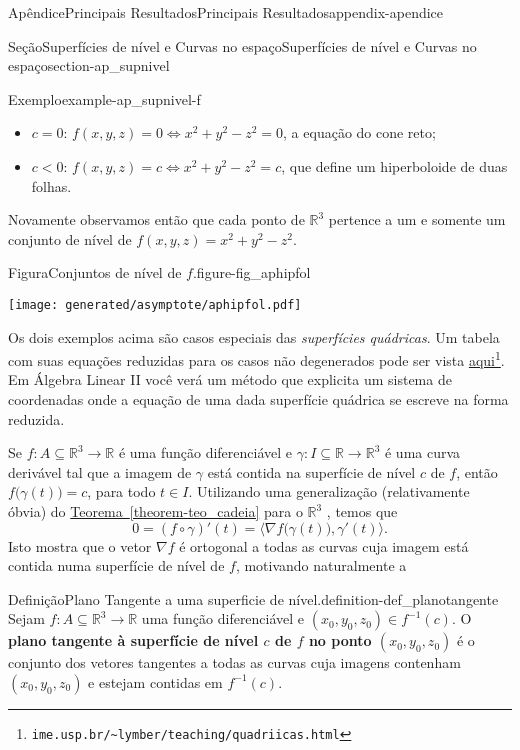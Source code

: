 \documentclass[oneside,10pt,]{book}
\newcommand{\xreffont}{\relax}
\newcommand{\terminology}[1]{\textbf{#1}}
\numberwithin{equation}{section}
\newcommand{\R}{\mathbb R}
\begin{document}
\begin{appendixptx}{Apêndice}{Principais Resultados}{}{Principais Resultados}{}{}{appendix-apendice}
\begin{sectionptx}{Seção}{Superfícies de nível e Curvas no espaço}{}{Superfícies de nível e Curvas no espaço}{}{}{section-ap_supnivel}
\begin{example}{Exemplo}{}{example-ap_supnivel-f}
\begin{itemize}[label=\textbullet]
\item{}\(c=0\): \(f(x,y,z)=0\iff x^2+y^2-z^2=0\), a equação do cone reto;%
\item{}\(c<0\): \(f(x,y,z)=c\iff x^2+y^2-z^2=c\), que define um hiperboloide de duas folhas.%
\end{itemize}
Novamente observamos então que cada ponto de \(\R^3\) pertence a um e somente um conjunto de nível de \(f(x,y,z)=x^2+y^2-z^2\). \begin{figureptx}{Figura}{Conjuntos de nível de \(f\).}{figure-fig_aphipfol}{}%
\begin{image}{0.25}{0.5}{0.25}{}%
\texttt{[image: generated/asymptote/aphipfol.pdf]}
\end{image}%
\tcblower
\end{figureptx}%
%
\end{example}
Os dois exemplos acima são casos especiais das \emph{superfícies quádricas}. Um tabela com suas equações reduzidas para os casos não degenerados pode ser vista \href{https://www.ime.usp.br/\~lymber/teaching/quadricas/index.html}{aqui}\footnote{\nolinkurl{ime.usp.br/\~lymber/teaching/quadriicas.html}\label{fn-ap_supnivel-g-c}}. Em Álgebra Linear II você verá um método que explicita um sistema de coordenadas onde a equação de uma dada superfície quádrica se escreve na forma reduzida.%
\par
Se \(f\colon A\subseteq\R^3\to\R\) é uma função diferenciável e \(\gamma\colon I\subseteq\R\to\R^3\) é uma curva derivável tal que a imagem de \(\gamma\) está contida na superfície de nível \(c\) de \(f\), então \(f\big(\gamma(t)\big)=c\), para todo \(t\in
I\). Utilizando uma generalização (relativamente óbvia) do \hyperref[theorem-teo_cadeia]{Teorema~{\xreffont\ref{theorem-teo_cadeia}}} para o \(\R^3\) , temos que%
\begin{equation*}
0=(f\circ\gamma)'(t)=\Big\langle\nabla
f\big(\gamma(t)\big),\gamma'(t)\Big\rangle.
\end{equation*}
Isto mostra que o vetor \(\nabla f\) é ortogonal a todas as curvas cuja imagem está contida numa superfície de nível de \(f\), motivando naturalmente a%
\begin{definition}{Definição}{Plano Tangente a uma superficie de nível.}{definition-def_planotangente}%
 Sejam \(f\colon A\subseteq\R^3\to\R\) uma função diferenciável e \((x_0,y_0,z_0)\in f^{-1}(c)\). O \terminology{plano tangente à superfície de nível \(c\) de \(f\) no ponto \((x_0,y_0,z_0)\)} é o conjunto dos vetores tangentes a todas as curvas cuja imagens contenham \((x_0,y_0,z_0)\) e estejam contidas em \(f^{-1}(c)\).\end{definition}

\end{sectionptx}
\end{appendixptx}
\end{document}
